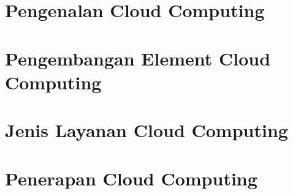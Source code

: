 \documentclass[11pt,a4paper]{book}
\begin{document}

\let\cleardoublepage\clearpage
\tableofcontents
\chapter{Pengenalan Cloud Computing}

\let\cleardoublepage\clearpage
\chapter{Pengembangan Element Cloud Computing}

\let\cleardoublepage\clearpage
\chapter{Jenis Layanan Cloud Computing}

\let\cleardoublepage\clearpage
\chapter{Penerapan Cloud Computing}

\let\cleardoublepage\clearpage

\let\cleardoublepage\clearpage
\end{document}
